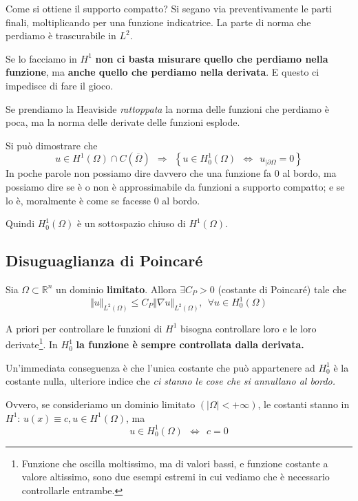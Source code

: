 \documentclass[10pt,a4paper,twoside,openright]{book}
\begin{document}
Come si ottiene il supporto compatto? Si segano via preventivamente le parti finali, moltiplicando per una funzione indicatrice. La parte di norma che perdiamo è trascurabile in $L^{2}$.

Se lo facciamo in $H^{1}$ \textbf{non ci basta misurare quello che perdiamo nella funzione}, ma \textbf{anche quello che perdiamo nella derivata}. E questo ci impedisce di fare il gioco.

Se prendiamo la Heaviside \textit{rattoppata} la norma delle funzioni che perdiamo è poca, ma la norma delle derivate delle funzioni esplode.

Si può dimostrare che
\begin{equation*}
    u\in H^{1}(\Omega) \cap C(\overline{\Omega }) \ \ \Rightarrow \ \ \left\{u\in H^{1}_{0}(\Omega) \ \ \Leftrightarrow \ \ u_{|\partial \Omega } =0\right\}
\end{equation*}
In poche parole non possiamo dire davvero che una funzione fa $0$ al bordo, ma possiamo dire se è o non è approssimabile da funzioni a supporto compatto; e se lo è, moralmente è come se facesse $0$ al bordo.

Quindi $H^{1}_{0}(\Omega)$ è un sottospazio chiuso di $H^{1}(\Omega)$.

\subsection{Disuguaglianza di Poincaré}
\begin{theorem}
     Sia $\Omega \subset \mathbb{R}^{n}$ un dominio \textbf{limitato}. Allora $\exists C_{P}  >0$ (costante di Poincaré) tale che
    \begin{equation}
        \Vert u\Vert _{L^{2}(\Omega)} \leqslant C_{P}\Vert \nabla u\Vert _{L^{2}(\Omega)} ,\ \ \forall u\in H^{1}_{0}(\Omega)
    \end{equation}
\end{theorem}
A priori per controllare le funzioni di $H^{1}$ bisogna controllare loro e le loro derivate\footnote{Funzione che oscilla moltissimo, ma di valori bassi, e funzione costante a valore altissimo, sono due esempi estremi in cui vediamo che è necessario controllarle entrambe.}. In $H^{1}_{0}$ \textbf{la funzione è sempre controllata dalla derivata.}
\begin{oss}
    Un'immediata conseguenza è che l'unica costante che può appartenere ad $H^{1}_{0}$ è la costante nulla, ulteriore indice che \textit{ci stanno le cose che si annullano al bordo.}

    Ovvero, se consideriamo un dominio limitato $(|\Omega |< +\infty)$, le costanti stanno in $H^{1} $: $u(x) \equiv c,u\in H^{1}(\Omega)$,  ma
    \begin{equation*}
        u\in H_{0}^{1}(\Omega) \ \ \Leftrightarrow \ \ c=0
    \end{equation*}
\end{oss}
\end{document}

